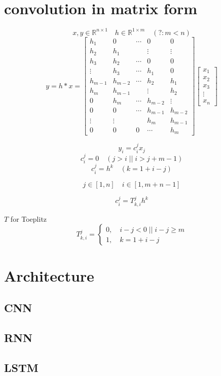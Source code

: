 \documentclass[12pt,a4paper]{article}
\begin{document}
\section{convolution in matrix form}
\[
x,y \in \mathbb{R}^{n \times 1} \quad h \in \mathbb{R}^{1 \times m} \quad (?:m < n)
\]
\[
y = h*x = \begin{bmatrix}
h_1 & 0 & \cdots & 0 & 0\\
h_2 & h_1 & & \vdots & \vdots \\
h_3 & h_2 & \cdots &0 &0 \\
\vdots  & h_3 &\cdots & h_1 & 0 \\
h_{m-1} &h_{m-2}&\cdots & h_2 & h_1 \\
h_{m} & h_{m-1} & & \vdots & h_2 \\
0 & h_{m} & \cdots & h_{m-2} & \vdots \\
0 & 0 & \cdots & h_{m-1} & h_{m-2} \\
\vdots & \vdots & & h_{m} & h_{m-1} \\
0 & 0 & 0 & \cdots & h_{m}
\end{bmatrix}\begin{bmatrix}
x_1 \\ x_2 \\x_3 \\ \vdots \\ x_n
\end{bmatrix}
\]

\[
y_i = c^{j}_{i}x_j
\]
\[
c^{j}_{i} = 0 \quad (j > i \;||\; i > j+m-1)
\]
\[
c^{j}_{i} = h^k \quad (k = 1 + i - j)
\]

\[ j \in [1,n] \quad i \in [1,m+n -1]\]


\[
c^{j}_{i} = T^{j}_{k,i}h^k
\]

$T$ for Toeplitz
\[
T^{j}_{k,i} = \begin{cases}
0, \quad i-j< 0 \;||\; i-j \geq m \\
1,\quad k = 1 + i - j
\end{cases}
\]

\section{Architecture}
\subsection{CNN}
\subsection{RNN}
\subsection{LSTM}
\end{document}
